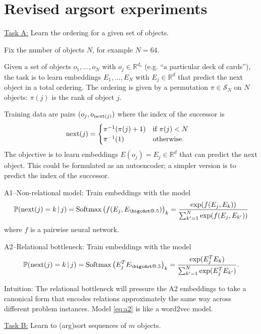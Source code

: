 \documentclass[12pt,pdftex,noinfoline]{imsart}
\makeatletter
\newcommand*\bigcdot{\mathpalette\bigcdot@{.5}}
\newcommand*\bigcdot@[2]{\mathbin{\vcenter{\hbox{\scalebox{#2}{$\m@th#1\bullet$}}}}}
\def\given{\,|\,}
\def\P{\mathbb{P}}
\def\reals{\mathbb{R}}
\def\softmax#1{\mbox{Softmax}\left(#1\right)}
\def\S{{\mathcal{S}}}
\def\next#1{{\text{\rm next}(#1)}}
\makeatother
\begin{document}
\section*{Revised argsort experiments}

\underline{Task A:} Learn the ordering for a given set of objects.

Fix the number of objects $N$, for example $N=64$.

Given a set of objects $o_1, \ldots, o_{N}$ with $o_j\in\reals^{d_o}$ (e.g. ``a particular deck of cards''), 
the task is to learn embeddings $E_1,\ldots, E_{N}$ with $E_j\in\reals^d$ that predict the next object in a total ordering. The ordering is given by a permutation $\pi \in \S_{N}$ on $N$ objects: $\pi(j)$ is the rank of object $j$.

Training data are pairs $(o_j, o_\next{j})$ where the index of the successor is 
\begin{align}
    \next{j} &= \begin{cases}
        \pi^{-1}(\pi(j)+1) & \text{if $\pi(j)<N$}\\
        \pi^{-1}(1) & \text{otherwise}.
    \end{cases}
\end{align}
The objective is to learn embeddings 
$E(o_j) = E_j\in\reals^d$ that can predict the next object. This could be formulated as an autoencoder; a simpler 
version is to predict the index of the successor.

A1--Non-relational model: Train embeddings with the model 
\begin{equation}
    \P(\next{j}=k \given j) = \softmax{f(E_j, E_{\bigcdot})}_k = \frac{\exp(f(E_j, E_k))}{\sum_{k'=1}^N \exp(f(E_j, E_{k'}))}
\end{equation}
where $f$ is a pairwise neural network.

A2--Relational bottleneck: Train embeddings with the model
\begin{equation}
 \P(\next{j}=k \given j) = \softmax{E_j^T E_{\bigcdot}}_k = \frac{\exp(E_j^T E_k)}{\sum_{k'=1}^N \exp(E_j^T E_{k'})}.
 \label{eq:a2}
\end{equation}


Intuition: The relational bottleneck will pressure the A2 embeddings to take a canonical form that  
encodes relations approximately the same way across different problem instances. Model \eqref{eq:a2} is like a word2vec model.


\vskip10pt
\underline{Task B:} Learn to (arg)sort sequences of $m$ objects.
\end{document}
